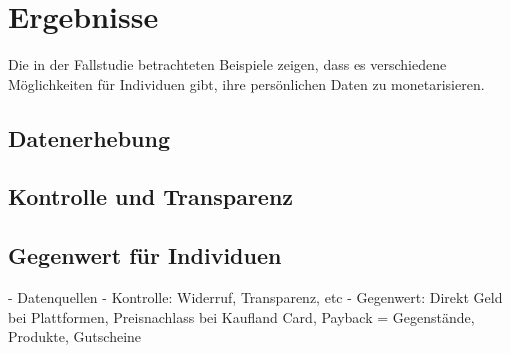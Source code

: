 \section{Ergebnisse}
Die in der Fallstudie betrachteten Beispiele zeigen, dass es verschiedene Möglichkeiten für Individuen gibt, ihre persönlichen Daten zu monetarisieren. 

\subsection{Datenerhebung}

\subsection{Kontrolle und Transparenz}

\subsection{Gegenwert für Individuen}

- Datenquellen
- Kontrolle: Widerruf, Transparenz, etc
- Gegenwert: Direkt Geld bei Plattformen, Preisnachlass bei Kaufland Card, Payback = Gegenstände, Produkte, Gutscheine

